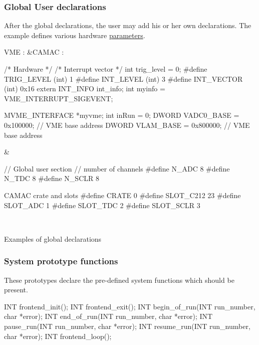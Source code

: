 \par
 \hypertarget{FE_code_sections_FE_global_user}{}\subsubsection{Global User declarations}\label{FE_code_sections_FE_global_user}
After the global declarations, the user may add his or her own declarations. The example defines various hardware \hyperlink{structparameters}{parameters}. \begin{table}[h]\begin{TabularC}{2}
\hline
VME :  &CAMAC :  \\

\begin{DoxyCode}
/* Hardware */
/* Interrupt vector */
int trig_level =  0;
#define TRIG_LEVEL  (int) 1
#define INT_LEVEL   (int) 3
#define INT_VECTOR  (int) 0x16
extern INT_INFO int_info;
int myinfo = VME_INTERRUPT_SIGEVENT;

MVME_INTERFACE *myvme;
int  inRun = 0;
DWORD VADC0_BASE = 0x100000; // VME base address
DWORD VLAM_BASE  = 0x800000; // VME base address
\end{DoxyCode}
  &
\begin{DoxyCode}
    // Global user section
    // number of channels
    #define N_ADC  8  
    #define N_TDC  8 
    #define N_SCLR 8

    CAMAC crate and slots
    #define CRATE      0
    #define SLOT_C212 23
    #define SLOT_ADC   1
    #define SLOT_TDC   2
    #define SLOT_SCLR  3
\end{DoxyCode}
 \\
\end{TabularC}
\centering
\caption{Examples of global declarations }
\end{table}
\par


\par
 \hypertarget{FE_code_sections_FE_system_prototypes}{}\subsubsection{System prototype functions}\label{FE_code_sections_FE_system_prototypes}
These prototypes declare the pre-\/defined system functions which should be present. 
\begin{DoxyCode}
INT frontend_init();
INT frontend_exit();
INT begin_of_run(INT run_number, char *error);
INT end_of_run(INT run_number, char *error);
INT pause_run(INT run_number, char *error);
INT resume_run(INT run_number, char *error);
INT frontend_loop();
\end{DoxyCode}
 \par


